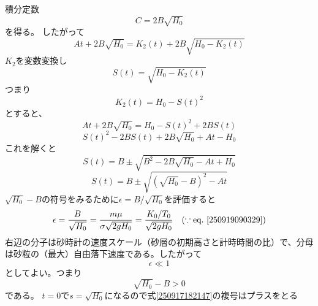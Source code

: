 \documentclass[dvipdfmx]{article}
\begin{document}
積分定数
\begin{equation} \label{250917180719} 
  C = 2B\sqrt{H_0}
\end{equation}
を得る。
したがって
\begin{equation} \label{250917181329} 
   A t + 2B\sqrt{H_0} = K_2(t) + 2B\sqrt{H_0-K_2(t)}
\end{equation}
$K_2$を変数変換し
\begin{equation} \label{250917181440} 
   S(t) =  \sqrt{H_0 - K_2(t)}
\end{equation}
つまり
\begin{equation} \label{250917181759} 
   K_2(t) = H_0 - S(t)^2
\end{equation}
とすると、
\begin{equation} \label{250917181553} 
   A t + 2B\sqrt{H_0}  = H_0 - S(t)^2 + 2BS(t)
\end{equation}
\begin{equation} \label{250917181633} 
   S(t)^2 - 2BS(t) + 2B\sqrt{H_0} + At - H_0
\end{equation}
これを解くと
\begin{equation} \label{250917181902} 
   S(t) = B \pm \sqrt{B^2-2B\sqrt{H_0} -At + H_0}
\end{equation}
\begin{equation} \label{250917182147} 
   S(t) = B\pm \sqrt{(\sqrt{H_0}-B)^2-At}
\end{equation}
$\sqrt{H_0}-B$の符号をみるために$\epsilon = B/\sqrt{H_0}$を評価すると
\begin{equation} \label{250917182519} 
   \epsilon = \frac{B}{\sqrt{H_0}} = \frac{m\mu}{\sigma\sqrt{2gH_0}} = \frac{K_0/T_0}{\sqrt{2gH_0}}  \quad(\because \text{eq.~\eqref{250919090329}})
\end{equation}
右辺の分子は砂時計の速度スケール（砂層の初期高さと計時時間の比）で、分母は砂粒の（最大）自由落下速度である。したがって
\begin{equation} \label{250917183422} 
    \epsilon \ll 1
\end{equation}
としてよい。つまり
\begin{equation} \label{250917183450} 
   \sqrt{H_0}-B >0
\end{equation}
である。
$t=0$で$s=\sqrt{H_0}$になるので式\eqref{250917182147}の複号はプラスをとる
\end{document}
